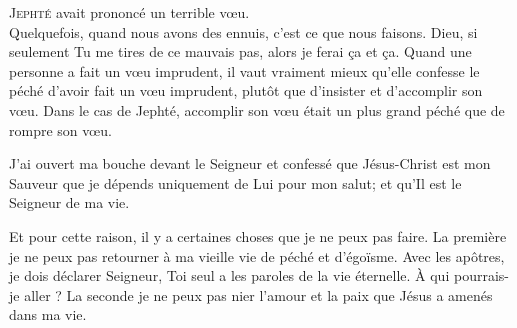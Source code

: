 \dvrule







\lettrine{J}{ephté} avait prononcé un terrible v\oe{}u. \\[1ex]
Quelquefois, quand nous avons des ennuis, c'est ce que nous faisons.
 \Og Dieu, si seulement Tu me tires de ce mauvais pas,
 alors je ferai \c{c}a et \c{c}a. \Fg{}
 Quand une personne a fait un v\oe{}u imprudent,
 il vaut vraiment mieux qu'elle confesse le péché d'avoir fait un v\oe{}u imprudent,
 plutôt que d'insister et d'accomplir son v\oe{}u.
 Dans le cas de Jephté, accomplir son v\oe{}u était un plus grand péché
 que de rompre son v\oe{}u.


J'ai ouvert ma bouche devant le Seigneur et confessé que Jésus-Christ
 est mon Sauveur\frcolon{} que je dépends uniquement de Lui pour mon salut;
 et qu'Il est le Seigneur de ma vie.

Et pour cette raison, il y a certaines choses que je ne peux pas faire.
 La première\frcolon{} je ne peux pas retourner à ma vieille vie de péché et d'égoïsme.
 Avec les apôtres, je dois déclarer\frcolon{}
 \Og Seigneur, Toi seul a les paroles de la vie éternelle.
 \`A qui pourrais-je aller ? \Fg{}
 La seconde\frcolon{} je ne peux pas nier l'amour et la paix que Jésus
 a amenés dans ma vie. 

\dvrule



